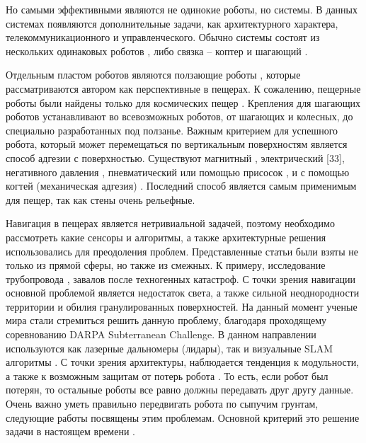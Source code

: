 Но самыми эффективными являются не одинокие роботы, но системы. В данных системах появляются дополнительные задачи, как архитектурного характера, телекоммуникационного и управленческого. Обычно системы состоят из нескольких одинаковых роботов \cite{Vaquero2018}, либо связка – коптер и шагающий \cite{Chen2010,Cantelli2013}.

Отдельным пластом роботов являются ползающие роботы \cite{Schmidt2013}, которые рассматриваются автором как перспективные в пещерах. К сожалению, пещерные роботы были найдены только для космических пещер \cite{Parness2017}. Крепления для шагающих роботов устанавливают во всевозможных роботов, от шагающих и колесных, до специально разработанных под ползанье. Важным критерием для успешного робота, который может перемещаться по вертикальным поверхностям является способ адгезии с поверхностью. Существуют магнитный \cite{Lee2012,Tavakoli2012,Kotay1996,Xu2017}, электрический \cite{Li2017}[33], негативного давления \cite{Lee2012,Tavakoli2012,Papachristos2019}, пневматический или помощью присосок \cite{Nagakubo1994,Tlale2012}, и с помощью когтей (механическая адгезия) \cite{Parness2017,Bretl2006,SangbaeKim2005,Sintov2011}. Последний способ является самым применимым для пещер, так как стены очень рельефные.

Навигация в пещерах является нетривиальной задачей, поэтому необходимо рассмотреть какие сенсоры и алгоритмы, а также архитектурные решения использовались для преодоления проблем. Представленные статьи были взяты не только из прямой сферы, но также из смежных. К примеру, исследование трубопровода \cite{Savin2017}, завалов после техногенных катастроф. С точки зрения навигации основной проблемой является недостаток света, а также сильной неоднородности территории и обилия гранулированных поверхностей. На данный момент ученые мира стали стремиться решить данную проблему, благодаря проходящему соревнованию DARPA Subterranean Challenge. В данном направлении используются как лазерные дальномеры (лидары), так и визуальные SLAM алгоритмы \cite{Mascarich2018a,Dang2019a,Fairfield2006,Chhaniyara2012}. С точки зрения архитектуры, наблюдается тенденция к модульности, а также к возможным защитам от потерь робота \cite{Miller2019,Wei2009}. То есть, если робот был потерян, то остальные роботы все равно должны передавать друг другу данные. Очень важно уметь правильно передвигать робота по сыпучим грунтам, следующие работы посвящены этим проблемам. Основной критерий это решение задачи в настоящем времени \cite{Tan2016,Savin2017,Chhaniyara2012,Tsounis2019, Li2009,Bjelonic2019,DeViragh2019,Buchanan2019}.

